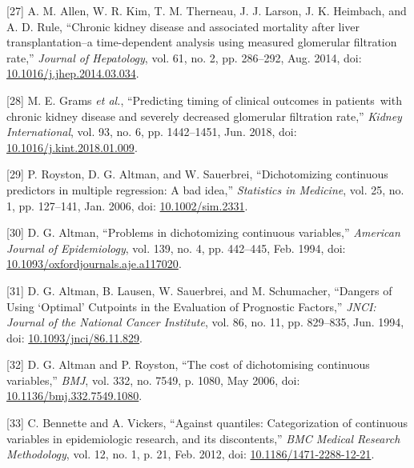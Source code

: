 \documentclass[
]{article}
\newenvironment{cslreferences}%
  {}%
  {\par}
\begin{document}
\begin{cslreferences}
\leavevmode\hypertarget{ref-allen_chronic_2014}{}%
{[}27{]} A. M. Allen, W. R. Kim, T. M. Therneau, J. J. Larson, J. K. Heimbach, and A. D. Rule, ``Chronic kidney disease and associated mortality after liver transplantation--a time-dependent analysis using measured glomerular filtration rate,'' \emph{Journal of Hepatology}, vol. 61, no. 2, pp. 286--292, Aug. 2014, doi: \href{https://doi.org/10.1016/j.jhep.2014.03.034}{10.1016/j.jhep.2014.03.034}.

\leavevmode\hypertarget{ref-grams_predicting_2018}{}%
{[}28{]} M. E. Grams \emph{et al.}, ``Predicting timing of clinical outcomes in patients~with chronic kidney disease and severely decreased glomerular filtration rate,'' \emph{Kidney International}, vol. 93, no. 6, pp. 1442--1451, Jun. 2018, doi: \href{https://doi.org/10.1016/j.kint.2018.01.009}{10.1016/j.kint.2018.01.009}.

\leavevmode\hypertarget{ref-royston_dichotomizing_2006}{}%
{[}29{]} P. Royston, D. G. Altman, and W. Sauerbrei, ``Dichotomizing continuous predictors in multiple regression: A bad idea,'' \emph{Statistics in Medicine}, vol. 25, no. 1, pp. 127--141, Jan. 2006, doi: \href{https://doi.org/10.1002/sim.2331}{10.1002/sim.2331}.

\leavevmode\hypertarget{ref-altman_problems_1994-1}{}%
{[}30{]} D. G. Altman, ``Problems in dichotomizing continuous variables,'' \emph{American Journal of Epidemiology}, vol. 139, no. 4, pp. 442--445, Feb. 1994, doi: \href{https://doi.org/10.1093/oxfordjournals.aje.a117020}{10.1093/oxfordjournals.aje.a117020}.

\leavevmode\hypertarget{ref-altman_dangers_1994-1}{}%
{[}31{]} D. G. Altman, B. Lausen, W. Sauerbrei, and M. Schumacher, ``Dangers of Using `Optimal' Cutpoints in the Evaluation of Prognostic Factors,'' \emph{JNCI: Journal of the National Cancer Institute}, vol. 86, no. 11, pp. 829--835, Jun. 1994, doi: \href{https://doi.org/10.1093/jnci/86.11.829}{10.1093/jnci/86.11.829}.

\leavevmode\hypertarget{ref-altman_cost_2006-1}{}%
{[}32{]} D. G. Altman and P. Royston, ``The cost of dichotomising continuous variables,'' \emph{BMJ}, vol. 332, no. 7549, p. 1080, May 2006, doi: \href{https://doi.org/10.1136/bmj.332.7549.1080}{10.1136/bmj.332.7549.1080}.

\leavevmode\hypertarget{ref-bennette_against_2012-1}{}%
{[}33{]} C. Bennette and A. Vickers, ``Against quantiles: Categorization of continuous variables in epidemiologic research, and its discontents,'' \emph{BMC Medical Research Methodology}, vol. 12, no. 1, p. 21, Feb. 2012, doi: \href{https://doi.org/10.1186/1471-2288-12-21}{10.1186/1471-2288-12-21}.


\end{cslreferences}
\end{document}
